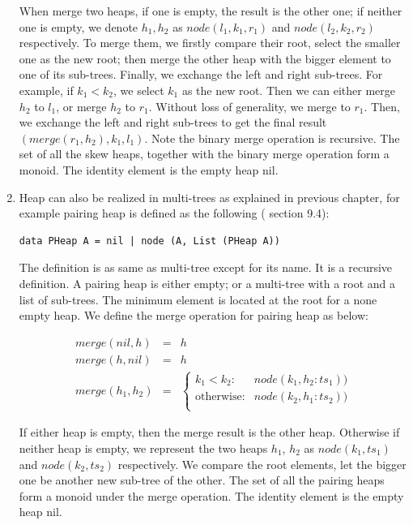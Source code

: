 \documentclass[b5paper]{article}
\begin{document}
\begin{enumerate}
When merge two heaps, if one is empty, the result is the other one; if neither one is empty, we denote $h_1, h_2$ as $node(l_1, k_1, r_1)$ and $node(l_2, k_2, r_2)$ respectively. To merge them, we firstly compare their root, select the smaller one as the new root; then merge the other heap with the bigger element to one of its sub-trees. Finally, we exchange the left and right sub-trees. For example, if $k_1 < k_2$, we select $k_1$ as the new root. Then we can either merge $h_2$ to $l_1$, or merge $h_2$ to $r_1$. Without loss of generality, we merge to $r_1$. Then, we exchange the left and right sub-trees to get the final result $(merge(r_1, h_2), k_1, l_1)$. Note the binary merge operation is recursive. The set of all the skew heaps, together with the binary merge operation form a monoid. The identity element is the empty heap nil.

\item Heap can also be realized in multi-trees as explained in previous chapter, for example pairing heap is defined as the following (\cite{LiuXinyu2017} section 9.4):

\begin{lstlisting}
data PHeap A = nil | node (A, List (PHeap A))
\end{lstlisting}

The definition is as same as multi-tree except for its name. It is a recursive definition. A pairing heap is either empty; or a multi-tree with a root and a list of sub-trees. The minimum element is located at the root for a none empty heap. We define the merge operation for pairing heap as below:

\[
\begin{array}{rcl}
merge(nil, h) & = & h \\
merge(h, nil) & = & h \\
merge(h_1, h_2) & = &
  \begin{cases}
  k_1 < k_2 : & node(k_1, h_2 : ts_1)) \\
  \text{otherwise} : & node(k_2, h_1 : ts_2)) \\
  \end{cases}
\end{array}
\]

If either heap is empty, then the merge result is the other heap. Otherwise if neither heap is empty, we represent the two heaps $h_1$, $h_2$ as $node(k_1, ts_1)$ and $node(k_2, ts_2)$ respectively. We compare the root elements, let the bigger one be another new sub-tree of the other. The set of all the pairing heaps form a monoid under the merge operation. The identity element is the empty heap nil.

\end{enumerate}
\end{document}
